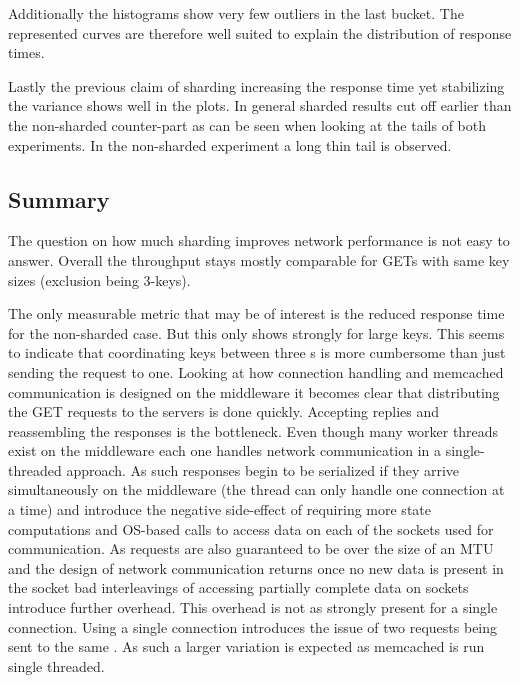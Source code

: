        Additionally the histograms show very few outliers in the last bucket. The represented curves are therefore well
        suited to explain the distribution of response times.

        Lastly the previous claim of sharding increasing the response time yet stabilizing the variance shows well in
        the plots. In general sharded results cut off earlier than the non-sharded counter-part as can be seen when
        looking at the tails of both experiments. In the non-sharded experiment a long thin tail is observed.

    \subsection{Summary\label{subsec:5_summary}}

        The question on how much sharding improves network performance is not easy to answer. Overall the throughput
        stays mostly comparable for GETs with same key sizes (exclusion being 3-keys).

        The only measurable metric that may be of interest is the reduced response time for the non-sharded case. But
        this only shows strongly for large keys. This seems to indicate that coordinating keys between three \srv{}s is
        more cumbersome than just sending the request to one. Looking at how connection handling and memcached
        communication is designed on the middleware it becomes clear that distributing the GET requests to the servers
        is done quickly. Accepting replies and reassembling the responses is the bottleneck. Even though many worker
        threads exist on the middleware each one handles network communication in a single-threaded approach. As such
        responses begin to be serialized if they arrive simultaneously on the middleware (the thread can only handle one
        connection at a time) and introduce the negative side-effect of requiring more state computations and OS-based
        calls to access data on each of the sockets used for communication. As requests are also guaranteed to be over
        the size of an MTU and the design of network communication returns once no new data is present in the socket bad
        interleavings of accessing partially complete data on sockets introduce further overhead. This overhead is not
        as strongly present for a single connection. Using a single connection introduces the issue of two requests
        being sent to the same \srv{}. As such a larger variation is expected as memcached is run single threaded.

